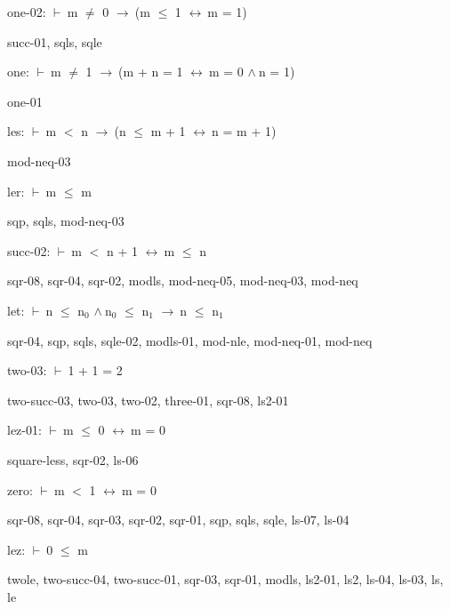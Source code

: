 \documentclass[a4paper]{article}
\newcommand{\Fol}{\mbox{$\vdash\ $}}
\newcommand{\And}{\mbox{$\wedge\ $}}
\newcommand{\Imp}{\mbox{$\rightarrow\ $}}
\newcommand{\Equiv}{\mbox{$\leftrightarrow\ $}}
\begin{document}
\bigskip

one-02: 
 \Fol m $\neq$ 0 \Imp (m $\le$ 1 \Equiv m = 1)



succ-01, sqls, sqle

\bigskip

one: 
 \Fol m $\neq$ 1 \Imp (m + n = 1 \Equiv m = 0 \And n = 1)



one-01

\bigskip

les: 
 \Fol m $<$ n \Imp (n $\le$ m + 1 \Equiv n = m + 1)



mod-neq-03

\bigskip

ler: 
 \Fol m $\le$ m



sqp, sqls, mod-neq-03

\bigskip

succ-02: 
 \Fol m $<$ n + 1 \Equiv m $\le$ n



sqr-08, sqr-04, sqr-02, modls, mod-neq-05, mod-neq-03, mod-neq

\bigskip

let: 
 \Fol n $\le$ $\mbox{n}_{0}$ \And $\mbox{n}_{0}$ $\le$ $\mbox{n}_{1}$ \Imp n $\le$ $\mbox{n}_{1}$



sqr-04, sqp, sqls, sqle-02, modls-01, mod-nle, mod-neq-01, mod-neq

\bigskip

two-03: 
 \Fol 1 + 1 = 2



two-succ-03, two-03, two-02, three-01, sqr-08, ls2-01

\bigskip

lez-01: 
 \Fol m $\le$ 0 \Equiv m = 0



square-less, sqr-02, ls-06

\bigskip

zero: 
 \Fol m $<$ 1 \Equiv m = 0



sqr-08, sqr-04, sqr-03, sqr-02, sqr-01, sqp, sqls, sqle, ls-07, ls-04

\bigskip

lez: 
 \Fol 0 $\le$ m



twole, two-succ-04, two-succ-01, sqr-03, sqr-01, modls, ls2-01, ls2, ls-04, ls-03, ls, le
\end{document}

